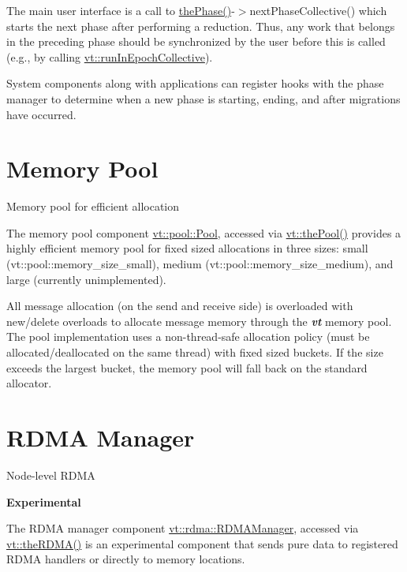 The main user interface is a call to {\ttfamily \hyperlink{namespacevt_a3799d6b51fb71d7b6505760aad457e61}{the\+Phase()}-\/$>$next\+Phase\+Collective()} which starts the next phase after performing a reduction. Thus, any work that belongs in the preceding phase should be synchronized by the user before this is called (e.\+g., by calling {\ttfamily \hyperlink{namespacevt_a2fc4ef34f30b49a1781d765804bfadbb}{vt\+::run\+In\+Epoch\+Collective}}).

System components along with applications can register hooks with the phase manager to determine when a new phase is starting, ending, and after migrations have occurred. \hypertarget{pool}{}\section{Memory Pool}\label{pool}
Memory pool for efficient allocation

The memory pool component {\ttfamily \hyperlink{structvt_1_1pool_1_1_pool}{vt\+::pool\+::\+Pool}}, accessed via {\ttfamily \hyperlink{namespacevt_aab3530d89a64e5ea903b0ccf303ecbb7}{vt\+::the\+Pool()}} provides a highly efficient memory pool for fixed sized allocations in three sizes\+: small ({\ttfamily vt\+::pool\+::memory\+\_\+size\+\_\+small}), medium ({\ttfamily vt\+::pool\+::memory\+\_\+size\+\_\+medium}), and large (currently unimplemented).

All message allocation (on the send and receive side) is overloaded with new/delete overloads to allocate message memory through the {\bfseries {\itshape vt}} memory pool. The pool implementation uses a non-\/thread-\/safe allocation policy (must be allocated/deallocated on the same thread) with fixed sized buckets. If the size exceeds the largest bucket, the memory pool will fall back on the standard allocator. \hypertarget{rdma}{}\section{R\+D\+MA Manager}\label{rdma}
Node-\/level R\+D\+MA

 {\bfseries Experimental}

The R\+D\+MA manager component {\ttfamily \hyperlink{structvt_1_1rdma_1_1_r_d_m_a_manager}{vt\+::rdma\+::\+R\+D\+M\+A\+Manager}}, accessed via {\ttfamily \hyperlink{namespacevt_a68b8410bc2b86d3b5228d7dbb6b40bac}{vt\+::the\+R\+D\+M\+A()}} is an experimental component that sends pure data to registered R\+D\+MA handlers or directly to memory locations.

